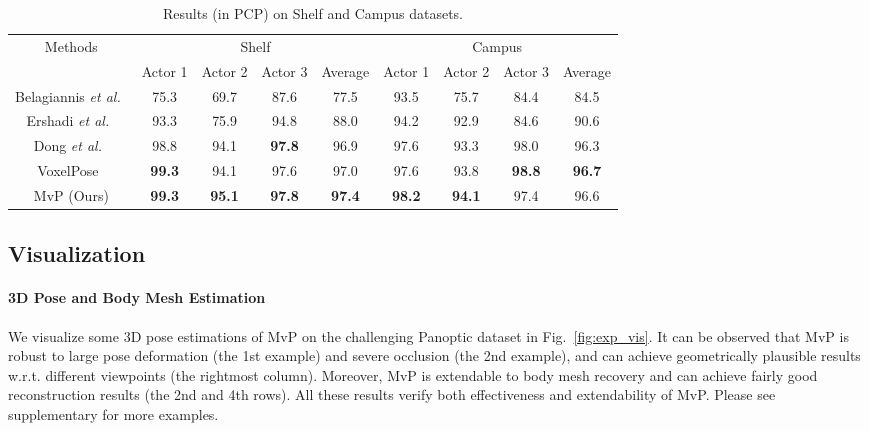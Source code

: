\documentclass{article}
\begin{document}
\begin{table}[h]
\centering
\caption{Results (in PCP) on Shelf and Campus datasets.}
\renewcommand{\tabcolsep}{3.5pt}
\small
\begin{tabular}{c|cccc|cccc}
\toprule
\multirow{2}{*}{Methods} & \multicolumn{4}{c|}{Shelf} & \multicolumn{4}{c}{Campus} \\ \cmidrule{2-9} 
        & Actor 1 & Actor 2 & Actor 3 & Average & Actor 1 & Actor 2 & Actor 3 &  Average   \\ \midrule
Belagiannis \textit{et al.}~\cite{belagiannis20153d}       &   75.3  &  69.7   &   87.6  &  77.5   &  93.5   &  75.7   & 84.4    &    84.5 \\ 
Ershadi \textit{et al.}~\cite{ershadi2018multiple}       &   93.3  &  75.9   &   94.8  &  88.0   &  94.2   &  92.9   & 84.6    &    90.6 \\ 
Dong \textit{et al.}~\cite{dong2019fast}       &   98.8  &  94.1   &  \textbf{97.8}  &  96.9   &  97.6   &  93.3   & 98.0    &    96.3 \\ 
VoxelPose~\cite{Tu2020}       &   \textbf{99.3}  & 94.1   &   97.6 &  97.0   &  97.6   &  {93.8}   & \textbf{98.8}    &    \textbf{96.7} \\ 
MvP (Ours)   &   \textbf{99.3}  & \textbf{95.1}   &   \textbf{97.8} &  \textbf{97.4}   &  \textbf{98.2}   &  \textbf{94.1}   & 97.4    &    96.6 \\ \bottomrule
\end{tabular}
\label{shelf_campus}
\end{table}

\subsection{Visualization}

\paragraph{3D Pose and Body Mesh Estimation} 
We visualize some 3D pose estimations of MvP on the challenging Panoptic dataset in Fig.~\ref{fig:exp_vis}. It can be observed that MvP is robust to large pose deformation (the 1st example) and severe occlusion (the 2nd example), and can achieve geometrically plausible results w.r.t. different viewpoints (the rightmost column). Moreover, MvP is extendable to body mesh recovery and can achieve fairly good reconstruction results (the 2nd and 4th rows). All these results verify both effectiveness and extendability of MvP. 
Please see supplementary for more examples.
\end{document}
